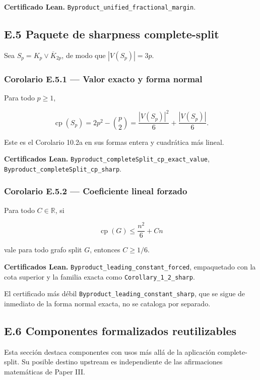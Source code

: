 \documentclass[
  spanish,
  11pt,
  a4paper,
]{article}
\begin{document}
\textbf{Certificado Lean.} \texttt{Byproduct\_unified\_fractional\_margin}.

\subsection{E.5 Paquete de sharpness complete-split}\label{e.5-paquete-de-sharpness-complete-split}

Sea \(S_p=K_p\vee\overline K_{2p}\), de modo que \(|V(S_p)|=3p\).

\subsubsection{Corolario E.5.1 --- Valor exacto y forma normal}\label{corolario-e.5.1-valor-exacto-y-forma-normal}

Para todo \(p\ge1\),

\[\operatorname{cp}(S_p)=2p^2-\binom p2=\frac{|V(S_p)|^2}{6}+\frac{|V(S_p)|}{6}.\]

Este es el Corolario 10.2a en sus formas entera y cuadrática más lineal.

\textbf{Certificados Lean.} \texttt{Byproduct\_completeSplit\_cp\_exact\_value}, \texttt{Byproduct\_completeSplit\_cp\_sharp}.

\subsubsection{Corolario E.5.2 --- Coeficiente lineal forzado}\label{corolario-e.5.2-coeficiente-lineal-forzado}

Para todo \(C\in\mathbb R\), si

\[\operatorname{cp}(G)\le \frac{n^2}{6}+Cn\]

vale para todo grafo split \(G\), entonces \(C\ge1/6\).

\textbf{Certificados Lean.} \texttt{Byproduct\_leading\_constant\_forced}, empaquetado con la cota superior y la familia exacta como \texttt{Corollary\_1\_2\_sharp}.

El certificado más débil \texttt{Byproduct\_leading\_constant\_sharp}, que se sigue de inmediato de la forma normal exacta, no se cataloga por separado.

\subsection{E.6 Componentes formalizados reutilizables}\label{e.6-componentes-formalizados-reutilizables}

Esta sección destaca componentes con usos más allá de la aplicación complete-split. Su posible destino upstream es independiente de las afirmaciones matemáticas de Paper III.
\end{document}

